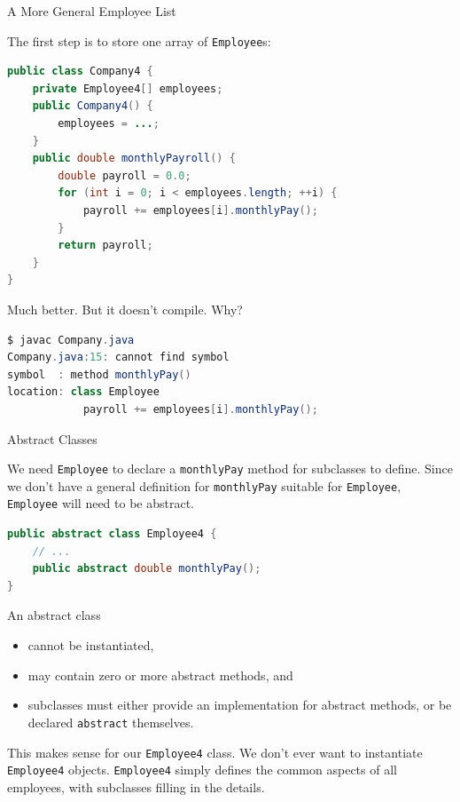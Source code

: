 \documentclass{beamer}
\begin{document}
\begin{frame}[fragile]{A More General Employee List}

\vspace{-.05in}
The first step is to store one array of {\tt Employee}s:
\vspace{-.05in}
\begin{lstlisting}[language=Java]
public class Company4 {
    private Employee4[] employees;
    public Company4() {
        employees = ...;
    }
    public double monthlyPayroll() {
        double payroll = 0.0;
        for (int i = 0; i < employees.length; ++i) {
            payroll += employees[i].monthlyPay();
        }
        return payroll;
    }
}
\end{lstlisting}
\vspace{-.05in}
Much better.  But it doesn't compile.  Why?
\vspace{-.05in}
\begin{lstlisting}[language=Java]
$ javac Company.java
Company.java:15: cannot find symbol
symbol  : method monthlyPay()
location: class Employee
            payroll += employees[i].monthlyPay();
\end{lstlisting}

\end{frame}


\begin{frame}[fragile]{Abstract Classes}


We need {\tt Employee} to declare a {\tt monthlyPay} method for subclasses to define.  Since we don't have a general definition for {\tt monthlyPay} suitable for {\tt Employee}, {\tt Employee} will need to be abstract.
\begin{lstlisting}[language=Java]
public abstract class Employee4 {
    // ...
    public abstract double monthlyPay();
}
\end{lstlisting}
An abstract class
\begin{itemize}
\item cannot be instantiated,
\item may contain zero or more abstract methods, and
\item subclasses must either provide an implementation for abstract methods, or be declared {\tt abstract} themselves.
\end{itemize}

This makes sense for our {\tt Employee4} class.  We don't ever want to instantiate {\tt Employee4} objects.  {\tt Employee4} simply defines the common aspects of all employees, with subclasses filling in the details.

\end{frame}
\end{document}
